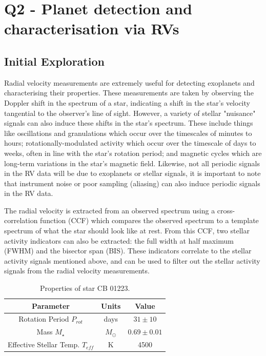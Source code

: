 
\section{Q2 - Planet detection and characterisation via RVs}\label{sec:q2}
\subsection{Initial Exploration}\label{subsec:q2-init-exploration}
Radial velocity measurements are extremely useful for detecting exoplanets and characterising their properties.
These measurements are taken by observing the Doppler shift in the spectrum of a star, indicating a shift in the star's velocity
tangential to the observer's line of sight.
However, a variety of stellar "nuisance" signals can also induce these shifts in the star's spectrum.
These include things like oscillations and granulations which occur over the timescales of minutes to hours; rotationally-modulated
activity which occur over the timescale of days to weeks, often in line with the star's rotation period; and magnetic cycles
which are long-term variations in the star's magnetic field.
Likewise, not all periodic signals in the RV data will be due to exoplanets or stellar signals, it is important to note
that instrument noise or poor sampling (aliasing) can also induce periodic signals in the RV data.

The radial velocity is extracted from an observed spectrum using a cross-correlation function (CCF) which compares the observed
spectrum to a template spectrum of what the star should look like at rest.
From this CCF, two stellar activity indicators can also be extracted: the full width at half maximum (FWHM) and the bisector
span (BIS).
These indicators correlate to the stellar activity signals mentioned above, and can be used to filter out the stellar
activity signals from the radial velocity measurements.

\begin{table}[htb]
    \centering
    \begin{tabular}{ccc}
        \toprule
        \toprule
        Parameter & Units & Value \\
        \midrule
        Rotation Period $P_{rot}$ & days & $31 \pm 10$ \\
        \addlinespace
        Mass $M_{\star}$ & $M_{\odot}$ & $0.69 \pm 0.01$ \\
        \addlinespace
        Effective Stellar Temp. $T_{eff}$ & K & 4500 \\
        \bottomrule
    \end{tabular}
    \caption{Properties of star CB 01223.}
    \label{tab:star_props}
\end{table}

